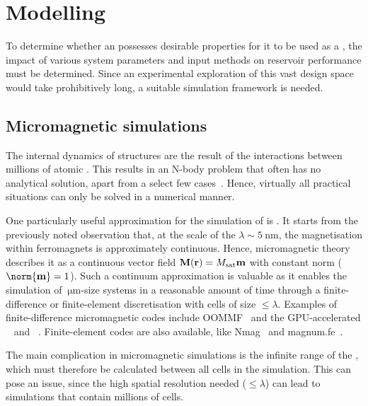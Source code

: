 \newpage
\section{Modelling}\label{sec:1:Modelling}
To determine whether an  possesses desirable properties for it to be used as a , the impact of various system parameters and input methods on reservoir performance must be determined.
Since an experimental exploration of this vast design space would take prohibitively long, a suitable simulation framework is needed.

\subsection{Micromagnetic simulations}
The internal  dynamics of  structures are the result of the interactions between millions of atomic .
This results in an N-body problem that often has no analytical solution, apart from a select few cases~\cite{PhD_Abert}.
Hence, virtually all practical situations can only be solved in a numerical manner. \par
One particularly useful approximation for the simulation of  is .
It starts from the previously noted observation that, at the scale of the  $\lambda \sim \SI{5}{\nano\metre}$, the magnetisation within ferromagnets is approximately continuous.
Hence, micromagnetic theory describes it as a continuous vector field $\boldsymbol{\mathbf{M}}(\boldsymbol{\mathbf{r}}) = M_\mathrm{sat} \boldsymbol{\mathbf{m}}$ with constant norm ($\norm{\vc{m}} = 1$).
Such a continuum approximation is valuable as it enables the simulation of $\SI{}{\micro\metre}$-size systems in a reasonable amount of time through a finite-difference or finite-element discretisation with cells of size $\leq \lambda$.
Examples of finite-difference micromagnetic codes include OOMMF~\cite{OOMMF} and the GPU-accelerated \mumax~\cite{mumax3} and \mumaxplus~\cite{MOR-24}.
Finite-element codes are also available, like Nmag~\cite{Nmag} and magnum.fe~\cite{magnumFE}. \par %
The main complication in micromagnetic simulations is the infinite range of the , which must therefore be calculated between all cells in the simulation.
This can pose an issue, since the high spatial resolution needed ($\leq \lambda$) can lead to simulations that contain millions of cells.
